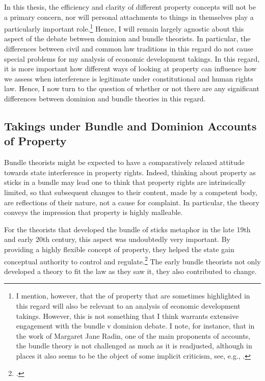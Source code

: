 In this thesis, the efficiency and clarity of different property concepts will not be a primary concern, nor will personal attachments to things in themselves play a particularly important role.\footnote{I mention, however, that the  of property that are sometimes highlighted in this regard will also be relevant to an analysis of economic development takings. However, this is not something that I think warrants extensive engagement with the bundle v dominion debate. I note, for instance, that in the work of Margaret Jane Radin, one of the main proponents of  accounts, the bundle theory is not challenged as much as it is readjusted, although in places it also seems to be the object of some implicit criticism, see, e.g., \cite[127-130]{radin93}.}
Hence, I will remain largely agnostic about this aspect of the debate between dominion and bundle theorists. In particular, the differences between civil and common law traditions in this regard do not cause special problems for my analysis of economic development takings. In this regard, it is more important how different ways of looking at property can influence how we assess when interference is legitimate under constitutional and human rights law. Hence, I now turn to the question of whether or not there are any significant differences between dominion and bundle theories in this regard.

\subsection{Takings under Bundle and Dominion Accounts of Property}

Bundle theorists might be expected to have a comparatively relaxed attitude towards state interference in property rights. Indeed, thinking about property as sticks in a bundle may lead one to think that property rights are intrinsically limited, so that subsequent changes to their content, made by a competent body, are reflections of their nature, not a cause for complaint. In particular, the theory conveys the impression that property is highly malleable. 

For the theorists that developed the bundle of sticks metaphor in the late 19th and early 20th century, this aspect was undoubtedly very important. By providing a highly flexible concept of property, they helped the state gain conceptual authority to control and regulate.\footcite[195]{klein11} The early bundle theorists not only developed a theory to fit the law as they saw it, they also contributed to change.

